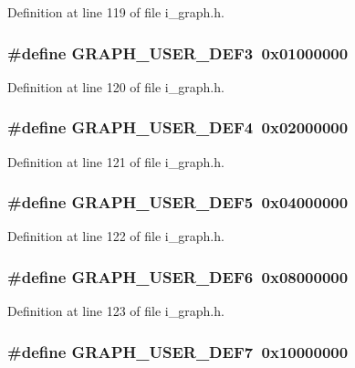 Definition at line 119 of file i\_\-graph.h.
\subsubsection{\setlength{\rightskip}{0pt plus 5cm}\#define GRAPH\_\-USER\_\-DEF3~0x01000000}\label{i__graph_8h_3267f41056ceb5e64b760ca134856a3a}




Definition at line 120 of file i\_\-graph.h.
\subsubsection{\setlength{\rightskip}{0pt plus 5cm}\#define GRAPH\_\-USER\_\-DEF4~0x02000000}\label{i__graph_8h_64b61460db9b774eb4623638dd0efe2b}




Definition at line 121 of file i\_\-graph.h.
\subsubsection{\setlength{\rightskip}{0pt plus 5cm}\#define GRAPH\_\-USER\_\-DEF5~0x04000000}\label{i__graph_8h_223f99b8aa6b954bceaabdfcbe67ad0d}




Definition at line 122 of file i\_\-graph.h.
\subsubsection{\setlength{\rightskip}{0pt plus 5cm}\#define GRAPH\_\-USER\_\-DEF6~0x08000000}\label{i__graph_8h_1d9b3683dded3b03daa992bf13c3e8a9}




Definition at line 123 of file i\_\-graph.h.
\subsubsection{\setlength{\rightskip}{0pt plus 5cm}\#define GRAPH\_\-USER\_\-DEF7~0x10000000}\label{i__graph_8h_7cb90b3ac0a2ad56d5dfa6763ab1c17b}




